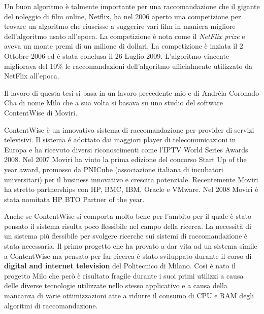 Un buon algoritmo \`e talmente importante per una raccomandazione che il gigante del noleggio di film online, Netflix, ha nel 2006 aperto una competizione per trovare un algoritmo che riuscisse a suggerire vari film in maniera migliore dell'algoritmo usato all'epoca. La competizione \`e nota come il \textit{NetFlix prize} \cite{netflixprize} e aveva un monte premi di un milione di dollari. La competizione \`e inziata il 2 Ottobre 2006 ed \`e stata conclusa il 26 Luglio 2009. L'algoritmo vincente migliorava del 10\% le raccomandazioni dell'algoritmo ufficialmente utilizzato da NetFlix all'epoca.

Il lavoro di questa tesi si basa in un lavoro precedente mio e di Andr\'eia Coronado Cha di nome Milo che a sua volta si basava su uno studio del software ContentWise \cite{ContentWise} di Moviri.

ContentWise \`e un innovativo sistema di raccomandazione per provider di servizi televisivi. Il sistema \'e adottato dai maggiori player di telecomunicazioni in Europa e ha ricevuto diversi riconoscimenti come l'IPTV World Series Awards 2008. Nel 2007 Moviri ha vinto la prima edizione del concorso Start Up of the year award, promosso da PNICube (associazione italiana di incubatori universitari) per il business innovativo e crescita potenziale. Recentemente Moviri ha stretto partnerships con HP, BMC, IBM, Oracle e VMware. Nel 2008 Moviri \`e stata nomitata HP BTO Partner of the year.

Anche se ContentWise si comporta molto bene per l'ambito per il quale \`e stato pensato il sistema risulta poco flessibile nel campo della ricerca. La necessit\`a di un sistema pi\`u flessibile per svolgere ricerche sui sistemi di raccomandazione \`e stata necessaria. Il primo progetto che ha provato a dar vita ad un sistema simile a ContentWise ma pensato per far ricerca \`e stato sviluppato durante il corso di \textbf{digital and internet television} del Politecnico di Milano. Cos\`i \`e nato il progetto Milo che per\`o \`e risultato fragile durante i suoi primi utilizzi a causa delle diverse tecnologie utilizzate nello stesso applicativo e a causa della mancanza di varie ottimizzazioni atte a ridurre il consumo di CPU e RAM degli algoritmi di raccomandazione.

